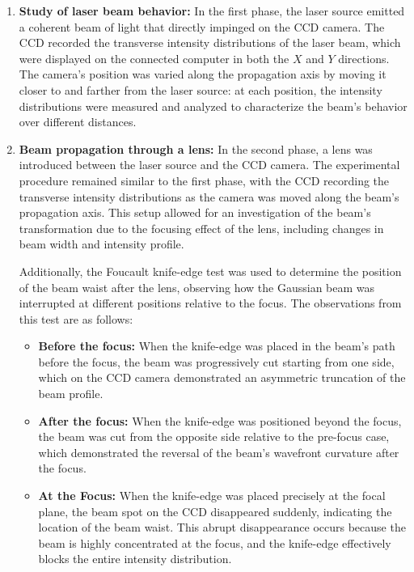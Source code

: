 \documentclass[prl,twocolumn]{revtex4-1}
\begin{document}
\begin{enumerate}
  \item \textbf{Study of laser beam behavior:}  
  In the first phase, the laser source emitted a coherent beam of light that directly impinged on the CCD camera. The CCD recorded the transverse intensity distributions of the laser beam, which were displayed on the connected computer in both the $X$ and $Y$ directions. The camera's position was varied along the propagation axis by moving it closer to and farther from the laser source: at each position, the intensity distributions were measured and analyzed to characterize the beam's behavior over different distances.

  \item \textbf{Beam propagation through a lens:}  
  In the second phase, a lens was introduced between the laser source and the CCD camera. The experimental procedure remained similar to the first phase, with the CCD recording the transverse intensity distributions as the camera was moved along the beam's propagation axis. This setup allowed for an investigation of the beam's transformation due to the focusing effect of the lens, including changes in beam width and intensity profile.

  Additionally, the Foucault knife-edge test was used to determine the position of the beam waist after the lens, observing how the Gaussian beam was interrupted at different positions relative to the focus. The observations from this test are as follows:
  \begin{itemize}
    \item \textbf{Before the focus:}  
    When the knife-edge was placed in the beam's path before the focus, the beam was progressively cut starting from one side, which on the CCD camera demonstrated an asymmetric truncation of the beam profile.

    \item \textbf{After the focus:}  
    When the knife-edge was positioned beyond the focus, the beam was cut from the opposite side relative to the pre-focus case, which demonstrated the reversal of the beam's wavefront curvature after the focus.

    \item \textbf{At the Focus:}  
    When the knife-edge was placed precisely at the focal plane, the beam spot on the CCD disappeared suddenly, indicating the location of the beam waist. This abrupt disappearance occurs because the beam is highly concentrated at the focus, and the knife-edge effectively blocks the entire intensity distribution.
  \end{itemize}


\end{enumerate}
\end{document}
